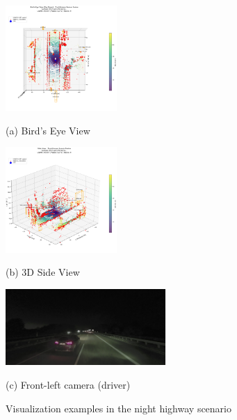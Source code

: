 \documentclass[10pt, a4paper, oneside]{article}
\begin{document}
\begin{small}
\end{small}
\begin{figure}[H]
    \centering
    \begin{minipage}[t]{0.32\textwidth}
        \centering
        \includegraphics[height=4cm]{../output/scene_night_highway/85c5ca01cfb34d3e92d1c0c265235d04/visualizations/top_view.png}
        \caption*{(a) Bird’s Eye View}
    \end{minipage}
    \begin{minipage}[t]{0.32\textwidth}
        \centering
        \includegraphics[height=4cm]{../output/scene_night_highway/85c5ca01cfb34d3e92d1c0c265235d04/visualizations/side_view.png}
        \caption*{(b) 3D Side View}
    \end{minipage}
    \begin{minipage}[t]{0.32\textwidth}
        \centering
        \includegraphics[height=2.9cm]{../output/scene_night_highway/85c5ca01cfb34d3e92d1c0c265235d04/front_left_camera.jpg}
        \caption*{(c) Front-left camera (driver)}
    \end{minipage}
    \caption{Visualization examples in the night highway scenario}
    \label{fig:night_highway_viz}
\end{figure}
\end{document}

